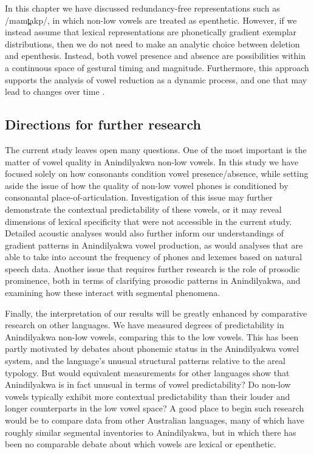 \documentclass[output=paper,colorlinks,citecolor=brown]{langscibook}
\begin{document}
In this chapter we have discussed redundancy-free representations such as /mamt̪akp/,
in which non-low vowels are treated as epenthetic. However, if we instead assume that lexical representations are phonetically gradient exemplar distributions, then we do not need to make an analytic choice between deletion and epenthesis. Instead, both vowel presence and absence are possibilities within a continuous space of gestural timing and magnitude. Furthermore, this approach supports the analysis of vowel reduction as a dynamic process, and one that may lead to changes over time \citep{Wedel:2013, HallEtAl2018}.

\subsection{Directions for further research}\label{sec:mansfield:6.2}
The current study leaves open many questions. One of the most important is the matter of vowel quality in Anindilyakwa non-low vowels. In this study we have focused solely on how consonants condition vowel presence/absence, while setting aside the issue of how the quality of non-low vowel phones is conditioned by consonantal place-of-articulation. Investigation of this issue may further demonstrate the contextual predictability of these vowels, or it may reveal dimensions of lexical specificity that were not accessible in the current study. Detailed acoustic analyses would also further inform our understandings of gradient patterns in Anindilyakwa vowel production, as would analyses that are able to take into account the frequency of phones and lexemes based on natural speech data. Another issue that requires further research is the role of prosodic prominence, both in terms of clarifying prosodic patterns in Anindilyakwa, and examining how these interact with segmental phenomena.

Finally, the interpretation of our results will be greatly enhanced by comparative research on other languages. We have measured degrees of predictability in Anindilyakwa non-low vowels, comparing this to the low vowels. This has been partly motivated by debates about phonemic status in the Anindilyakwa vowel system, and the language’s unusual structural patterns relative to the areal typology. But would equivalent measurements for other languages show that Anindilyakwa is in fact unusual in terms of vowel predictability? Do non-low vowels typically exhibit more contextual predictability than their louder and longer counterparts in the low vowel space? A good place to begin such research would be to compare data from other Australian languages, many of which have roughly similar segmental inventories to Anindilyakwa, but in which there has been no comparable debate about which vowels are lexical or epenthetic.
\end{document}
